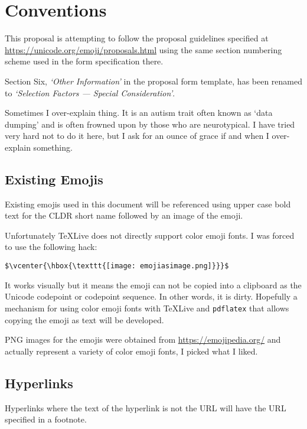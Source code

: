 \section*{Conventions}

This proposal is attempting to follow the proposal guidelines specified at
\url{https://unicode.org/emoji/proposals.html} using the same section numbering
scheme used in the form specification there.

Section Six, \textit{`Other Information'} in the proposal form template, has been renamed to
\textit{`Selection Factors --- Special Consideration'}.

Sometimes I over-explain thing. It is an autism trait often known as `data dumping' and
is often frowned upon by those who are neurotypical. I have tried very hard not to do
it here, but I ask for an ounce of grace if and when I over-explain something.

\subsection*{Existing Emojis}

Existing emojis used in this document will be referenced using upper case bold text for the CLDR short name
followed by an image of the emoji.

Unfortunately \TeX{}Live does not directly support color emoji fonts. I was forced to
use the following hack:

\begin{verbatim}
$\vcenter{\hbox{\texttt{[image: emojiasimage.png]}}}$
\end{verbatim}

It works visually but it means the emoji can not be copied into a clipboard as the
Unicode codepoint or codepoint sequence. In other words, it is dirty. Hopefully a
mechanism for using color emoji fonts with \TeX{}Live and \texttt{pdflatex} that
allows copying the emoji as text will be developed.

PNG images for the emojis were obtained from \url{https://emojipedia.org/} and actually
represent a variety of color emoji fonts, I picked what I liked.

\subsection*{Hyperlinks}

Hyperlinks where the text of the hyperlink is not the URL will have the URL specified
in a footnote.

